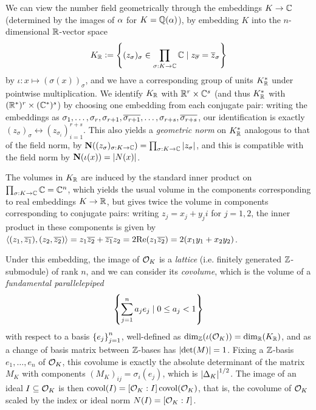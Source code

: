 \documentclass[11pt]{report}
\begin{document}
We can view the number field geometrically through the embeddings $K \to \mathbb{C}$ (determined by the images of $\alpha$ for $K = \mathbb{Q}(\alpha)$), by embedding $K$ into the $n$-dimensional $\mathbb{R}$-vector space 
$$
    K_{\mathbb{R}} \vcentcolon= \left\{  (z_\sigma)_{\sigma} \in \prod_{\sigma : K \to \mathbb{C}}\mathbb{C} \mid z_{\overline{\sigma}} = \overline{z}_\sigma  \right\}
$$
by $\iota : x \mapsto (\sigma(x))_{\sigma}$, and we have a corresponding group of units $K_{\mathbb{R}}^*$ under pointwise multiplication. We identify $K_{\mathbb{R}}$ with $\mathbb{R}^r \times \mathbb{C}^s$ (and thus $K_{\mathbb{R}}^*$ with $(\mathbb{R}^*)^r \times (\mathbb{C}^*)^s$) by choosing one embedding from each conjugate pair: writing the embeddings as $\sigma_1, \ldots, \sigma_r, \sigma_{r + 1}, \overline{\sigma_{r + 1}}, \ldots, \sigma_{r + s}, \overline{\sigma_{r + s}}$, our identification is exactly $(z_\sigma)_\sigma \leftrightarrow (z_{\sigma_i})_{i = 1}^{r + s}$. This also yields a \hypertarget{geomnorm}{\emph{geometric norm}} on $K_{\mathbb{R}}^*$ analogous to that of the field norm, by $\operatorname{\mathbf{N}}((z_\sigma)_{\sigma : K \to \mathbb{C}}) = \prod_{\sigma : K \to \mathbb{C}}\left| z_\sigma \right|$, and this is compatible with the field norm by $\operatorname{\mathbf{N}}(\iota(x)) = \left| N(x) \right|$.

The volumes in $K_{\mathbb{R}}$ are induced by the standard inner product on $\prod_{\sigma : K \to \mathbb{C}}\mathbb{C} = \mathbb{C}^n$, which yields the usual volume in the components corresponding to real embeddings $K \to \mathbb{R}$, but gives twice the volume in components corresponding to conjugate pairs: writing $z_j = x_j + y_ji$ for $j = 1, 2$, the inner product in these components is given by $\left\langle (z_1, \overline{z_1}), (z_2, \overline{z_2}) \right\rangle = z_1\overline{z_2} + \overline{z_1}z_2 = 2\text{Re}(z_1\overline{z_2}) = 2(x_1y_1 + x_2y_2)$.


Under this embedding, the image of $\mathcal{O}_K$ is a \emph{lattice} (i.e. finitely generated $\mathbb{Z}$-submodule) of rank $n$, and we can consider its \emph{covolume}, which is the volume of a \emph{fundamental parallelepiped} 
$$
    \left\{  \sum_{j = 1}^na_je_j \mid 0 \leq a_j < 1  \right\}
$$
with respect to a basis $\left\{  e_j  \right\}_{j = 1}^n$, well-defined as $\dim_{\mathbb{Z}}(\iota(\mathcal{O}_K)) = \dim_{\mathbb{R}}(K_{\mathbb{R}})$, and as a change of basis matrix between $\mathbb{Z}$-bases has $\left| \det(M) \right| = 1$. Fixing a $\mathbb{Z}$-basis $e_1, \ldots, e_n$ of $\mathcal{O}_K$, this covolume is exactly the absolute determinant of the matrix $M_K$ with components $(M_K)_{ij} = \sigma_i(e_j)$, which is $\left| \Delta_K \right|^{1/2}$. The image of an ideal $I \subseteq \mathcal{O}_K$ is then $\operatorname{covol}(I) = [\mathcal{O}_K : I]\operatorname{covol}(\mathcal{O}_K)$, that is, the covolume of $\mathcal{O}_K$ scaled by the index or ideal norm $N(I) = [\mathcal{O}_K : I]$.
\end{document}
